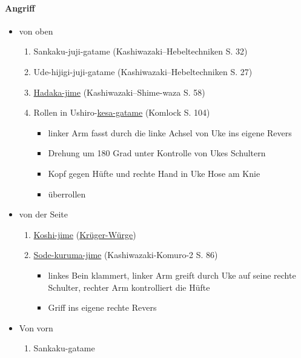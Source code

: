 \documentclass[justified, a4paper, notitlepage, captions=tableheading, nobib]{tufte-handout}
\begin{document}
\paragraph{Angriff}
\label{sec:org061734b}
\begin{itemize}
\item von oben
\begin{enumerate}
\item Sankaku-juji-gatame (Kashiwazaki--Hebeltechniken S. 32)
\item Ude-hijigi-juji-gatame (Kashiwazaki--Hebeltechniken S. 27)
\item \hyperref[org2ffc91d]{Hadaka-jime} (Kashiwazaki--Shime-waza S. 58)
\item Rollen in Ushiro-\hyperref[org5004057]{kesa-gatame} (Komlock S. 104)
\begin{itemize}
\item linker Arm fasst durch die linke Achsel von Uke ins eigene Revers
\item Drehung um 180 Grad unter Kontrolle von Ukes Schultern
\item Kopf gegen Hüfte und rechte Hand in Uke Hose am Knie
\item überrollen
\end{itemize}
\end{enumerate}
\item von der Seite
\begin{enumerate}
\item \hyperref[org5efae84]{Koshi-jime} (\hyperref[orge0fd603]{Krüger-Würge})
\item \hyperref[orga86277e]{Sode-kuruma-jime} (Kashiwazaki-Komuro-2 S. 86)
\begin{itemize}
\item linkes Bein klammert, linker Arm greift durch Uke auf seine rechte Schulter, rechter Arm kontrolliert die Hüfte
\item Griff ins eigene rechte Revers
\end{itemize}
\end{enumerate}
\item Von vorn
\begin{enumerate}
\item Sankaku-gatame
\end{enumerate}
\end{itemize}
\end{document}
